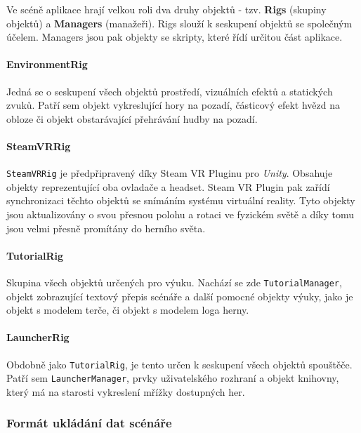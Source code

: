 Ve scéně aplikace hrají velkou roli dva druhy objektů - tzv.
\textbf{Rigs} (skupiny objektů) a \textbf{Managers} (manažeři). Rigs
slouží k seskupení objektů se společným účelem. Managers jsou pak
objekty se skripty, které řídí určitou část aplikace.

\paragraph{EnvironmentRig}\label{environmentrig}

Jedná se o seskupení všech objektů prostředí, vizuálních efektů a
statických zvuků. Patří sem objekt vykreslující hory na pozadí,
částicový efekt hvězd na obloze či objekt obstarávající přehrávání hudby
na pozadí.

\paragraph{SteamVRRig}\label{steamvrrig}

\texttt{SteamVRRig} je předpřipravený díky Steam VR Pluginu pro
\emph{Unity}. Obsahuje objekty reprezentující oba ovladače a headset.
Steam VR Plugin pak zařídí synchronizaci těchto objektů se snímáním
systému virtuální reality. Tyto objekty jsou aktualizovány o svou
přesnou polohu a rotaci ve fyzickém světě a díky tomu jsou velmi přesně
promítány do herního světa.

\paragraph{TutorialRig}\label{tutorialrig}

Skupina všech objektů určených pro výuku. Nachází se zde
\texttt{TutorialManager}, objekt zobrazující textový přepis scénáře a
další pomocné objekty výuky, jako je objekt s modelem terče, či objekt s
modelem loga herny.

\paragraph{LauncherRig}\label{launcherrig}

Obdobně jako \texttt{TutorialRig}, je tento určen k seskupení všech
objektů spouštěče. Patří sem \texttt{LauncherManager}, prvky
uživatelského rozhraní a objekt knihovny, který má na starosti
vykreslení mřížky dostupných her.

\subsubsection{Formát ukládání dat
scénáře}\label{formuxe1t-ukluxe1duxe1nuxed-dat-scuxe9nuxe1ux159e}

